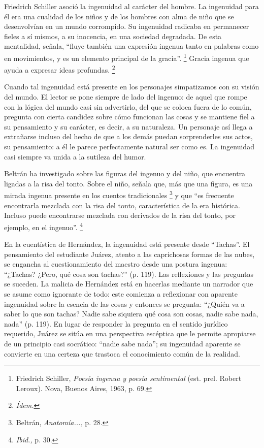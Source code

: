 \documentclass[14pt,twoside,final]{extbook} %
\let\oldfootnote\footnote
\renewcommand\footnote[1]{%
\oldfootnote{\hspace{1mm}#1}}
\begin{document}
Friedrich Schiller asoció la ingenuidad al carácter del hombre. La ingenuidad para él era una cualidad de los niños y de los hombres con alma de niño que se desenvolvían en un mundo corrompido. Su ingenuidad radicaba en permanecer fieles a sí mismos, a su inocencia, en una sociedad degradada. De esta mentalidad, señala, ``fluye también una expresión ingenua tanto en palabras como en movimientos, y es un elemento principal de la gracia''.\footnote{Friedrich Schiller, \emph{Poesía ingenua y poesía sentimental} (est. prel. Robert Leroux). Nova, Buenos Aires, 1963, p. 69.} Gracia ingenua que ayuda a expresar ideas profundas.\footnote{\em Ídem.}

Cuando tal ingenuidad está presente en los personajes simpatizamos con su visión del mundo. El lector se pone siempre de lado del ingenuo: de aquel que rompe con la lógica del mundo casi sin advertirlo, del que se coloca fuera de lo común, pregunta con cierta candidez sobre cómo funcionan las cosas y se mantiene fiel a su pensamiento y su carácter, es decir, a su naturaleza. Un personaje así llega a extrañarse incluso del hecho de que a los demás puedan sorprenderles sus actos, su pensamiento: a él le parece perfectamente natural ser como es. La ingenuidad casi siempre va unida a la sutileza del humor.

Beltrán ha investigado sobre las figuras del ingenuo y del niño, que encuentra ligadas a la risa del tonto. Sobre el niño, señala que, más que una figura, es una mirada ingenua presente en los cuentos tradicionales\footnote{Beltrán, \emph{Anatomía...,} p. 28.} y que ``es frecuente encontrarla mezclada con la risa del tonto, característica de la era histórica. Incluso puede encontrarse mezclada con derivados de la risa del tonto, por ejemplo, en el ingenuo''.\footnote{\emph{Ibid.,} p. 30.}

En la cuentística de Hernández, la ingenuidad está presente desde ``Tachas''. El pensamiento del estudiante Juárez, atento a las caprichosas formas de las nubes, se engancha al cuestionamiento del maestro desde una postura ingenua: ``¿Tachas? ¿Pero, qué cosa son tachas?'' (p. 119). Las reflexiones y las preguntas se suceden. La malicia de Hernández está en hacerlas mediante un narrador que se asume como ignorante de todo: este comienza a reflexionar con aparente ingenuidad sobre la esencia de las cosas y entonces se pregunta: ``¿Quién va a saber lo que son tachas? Nadie sabe siquiera qué cosa son cosas, nadie sabe nada, nada'' (p. 119). En lugar de responder la pregunta en el sentido jurídico
requerido, Juárez se sitúa en una perspectiva escéptica que le permite apropiarse de un principio casi socrático: ``nadie sabe nada''; su ingenuidad aparente se convierte en una certeza que trastoca el conocimiento común de la realidad.
\end{document}

